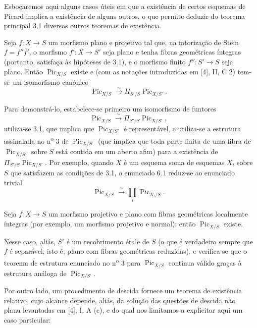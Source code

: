 
Esboçaremos aqui alguns casos úteis em que a existência de certos esquemas de
Picard implica a existência de alguns outros, o que permite deduzir do teorema
principal 3.1 diversos outros teoremas de existência.

 Seja $f:X\longrightarrow S$ um morfismo plano e
projetivo tal que, na fatorização de Stein $f=f''f'$, o morfismo
$f':X\longrightarrow S'$ seja plano e tenha fibras geométricas íntegras
(portanto, satisfaça às hipóteses de 3.1), e o morfismo finito
$f'':S'\longrightarrow S$ seja plano. Então $\operatorname{Pic}_{X/S}$ existe
e (com as notações introduzidas em [4], II, C 2) tem-se um isomorfismo canônico
\[
\operatorname{Pic}_{X/S}\xrightarrow{\sim}
\Pi_{S'/S}\operatorname{Pic}_{X/S'}.
\]

Para demonstrá-lo, estabelece-se primeiro um isomorfismo de funtores
\[
\operatorname{Pic}_{X/S}\xrightarrow{\sim}
\Pi_{S'/S}\operatorname{Pic}_{X/S'},
\]
utiliza-se 3.1, que implica que $\operatorname{Pic}_{X/S'}$ é representável, e
utiliza-se a estrutura assinalada no n\textsuperscript{o} 3 de
$\operatorname{Pic}_{X/S'}$ (que implica que toda parte finita de uma fibra de
$\operatorname{Pic}_{X/S'}$ sobre $S$ está contida em um aberto afim) para a
existência de $\Pi_{S'/S}\operatorname{Pic}_{X/S'}$.
Por exemplo, quando $X$ é um esquema soma de esquemas $X_i$ sobre $S$ que
satisfazem as condições de 3.1, o enunciado 6.1 reduz-se ao enunciado trivial
\[
\operatorname{Pic}_{X/S}\xrightarrow{\sim}
\prod_i\operatorname{Pic}_{X_i/S}.
\]

 Seja $f:X\longrightarrow S$ um morfismo projetivo e
plano com fibras geométricas localmente íntegras (por exemplo, um morfismo
projetivo e normal); então $\operatorname{Pic}_{X/S}$ existe.

Nesse caso, aliás, $S'$ é um recobrimento étale de $S$ (o que é verdadeiro
sempre que $f$ é separável, isto é, plano com fibras geométricas reduzidas), e
verifica-se que o teorema de estrutura enunciado no n\textsuperscript{o} 3 para
$\operatorname{Pic}_{X/S}$ continua válido graças à estrutura análoga de
$\operatorname{Pic}_{X/S'}$.

Por outro lado, um procedimento de descida fornece um teorema de existência
relativo, cujo alcance depende, aliás, da solução das questões de descida não
plana levantadas em [4], I, A (c), e do qual nos limitamos a explicitar aqui um
caso particular:

